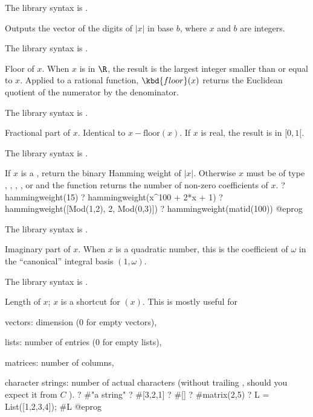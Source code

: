 The library syntax is .

\label{se:digits}
Outputs the vector of the digits of $|x|$ in base $b$, where $x$ and $b$ are integers.

The library syntax is .

\label{se:floor}
Floor of $x$. When $x$ is in $\R$, the result is the
largest integer smaller than or equal to $x$. Applied to a rational function,
$\kbd{floor}(x)$ returns the Euclidean quotient of the numerator by the
denominator.

The library syntax is .

\label{se:frac}
Fractional part of $x$. Identical to
$x-\text{floor}(x)$. If $x$ is real, the result is in $[0,1[$.

The library syntax is .

\label{se:hammingweight}
If $x$ is a , return the binary Hamming weight of $|x|$. Otherwise
$x$ must be of type , , , , or
 and the function returns the number of non-zero coefficients of
$x$.
\bprog
? hammingweight(15)
? hammingweight(x^100 + 2*x + 1)
? hammingweight([Mod(1,2), 2, Mod(0,3)])
? hammingweight(matid(100))
@eprog

The library syntax is .

\label{se:imag}
Imaginary part of $x$. When $x$ is a quadratic number, this is the
coefficient of $\omega$ in the ``canonical'' integral basis $(1,\omega)$.

The library syntax is .

\label{se:length}
Length of $x$; \kbd{\#}$x$ is a shortcut for $(x)$.
This is mostly useful for

\item vectors: dimension (0 for empty vectors),

\item lists: number of entries (0 for empty lists),

\item matrices: number of columns,

\item character strings: number of actual characters (without
trailing , should you expect it from $C$ ).
\bprog
 ? #"a string"
 ? #[3,2,1]
 ? #[]
 ? #matrix(2,5)
 ? L = List([1,2,3,4]); #L
@eprog

